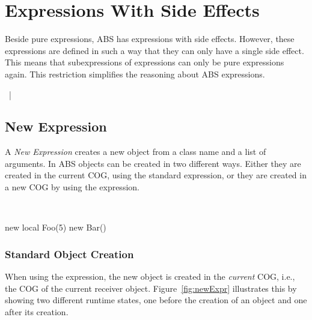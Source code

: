 
\chapter{Expressions With Side Effects}
\label{cha:expr-with-side}

Beside pure expressions, ABS has expressions with side effects.
However, these expressions are defined in such a way that they can only have a
single side effect. This means that subexpressions of expressions can only be
pure expressions again. This restriction simplifies the reasoning about ABS
expressions.

\begin{abssyntax}
     {}
         ~|~ \\
  {}
           {}
           {}
           {}
\end{abssyntax}

\section{New Expression}
A \emph{New Expression} creates a new object from a class name and a list of arguments. In ABS objects can be created in two different ways.
Either they are created in the current COG, using the standard  expression,
or they are created in a new COG by using the  expression.

\begin{abssyntax}
  {}\ \ \ \TRS{(}  \TRS{)}  
\end{abssyntax}

\begin{absexample}
new local Foo(5)
new Bar()
\end{absexample}

\subsection{Standard Object Creation}
When using the  expression, the new object is created in the \emph{current} COG, i.e., the COG of the current receiver object.
Figure~\ref{fig:newExpr} illustrates this by showing two different runtime states, one before the creation of an object  and one after its creation.

